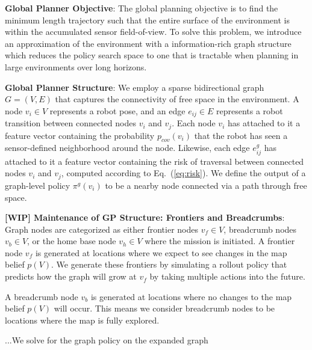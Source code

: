 \documentclass[letterpaper, 10pt, conference]{ieeeconf}      %
\newcommand{\ph}[1]{{\textbf{#1}:}} %
\newcommand{\rev}[1]{{\color{blue} #1 }} %
\begin{document}
\rev{\ph{Global Planner Objective} The global planning objective is to find the minimum length trajectory such that the entire surface of the environment is within the accumulated sensor field-of-view. To solve this problem, we introduce an approximation of the environment with a information-rich graph structure which reduces the policy search space to one that is tractable when planning in large environments over long horizons.

\ph{Global Planner Structure} We employ a sparse bidirectional graph $G = (V, E)$ that captures the connectivity of free space in the environment. A node $v_i \in V$ represents a robot pose, and an edge $e_{ij} \in E$ represents a robot transition between connected nodes $v_i$ and $v_j$. Each node $v_i$ has attached to it a feature vector containing the probability $p_{cov}(v_i)$ that the robot has seen a sensor-defined neighborhood around the node. Likewise, each edge $e_{ij}^g$ has attached to it a feature vector containing the risk of traversal between connected nodes $v_i$ and $v_j$, computed according to Eq.~(\ref{eq:risk}). We define the output of a graph-level policy $\pi^g(v_i)$ to be a nearby node connected via a path through free space.

\ph{[WIP] Maintenance of GP Structure: Frontiers and Breadcrumbs} 
Graph nodes are categorized as either frontier nodes $v_f \in V$, breadcrumb nodes $v_b \in V$, or the home base node $v_h \in V$ where the mission is initiated. A frontier node $v_f$ is generated at locations where we expect to see changes in the map belief $p(V)$. We generate these frontiers by simulating a rollout policy that predicts how the graph will grow at $v_f$ by taking multiple actions into the future. 


A breadcrumb node $v_b$ is generated at locations where no changes to the map belief $p(V)$ will occur. This means we consider breadcrumb nodes to be locations where the map is fully explored.

...We solve for the graph policy on the expanded graph  


}
\end{document}
